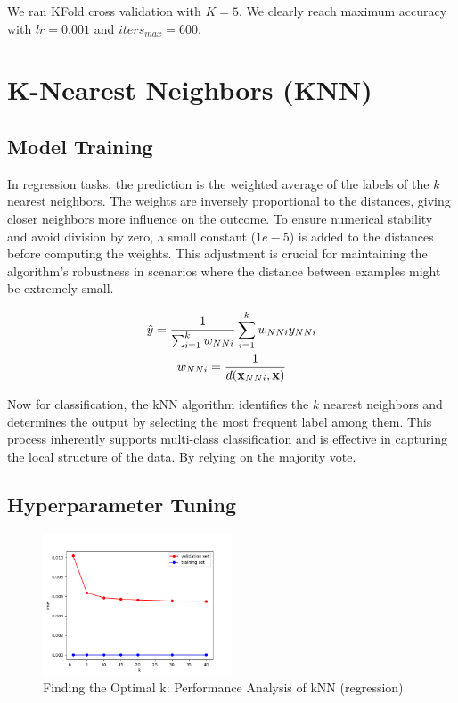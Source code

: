 \documentclass[10pt,twocolumn]{article}
\begin{document}
We ran KFold cross validation with \(K = 5\).
We clearly reach maximum accuracy with \(lr = 0.001\) and \(iters_{max} = 600\).

\section{K-Nearest Neighbors (KNN)}

\subsection{Model Training}
In regression tasks, the prediction is the weighted average of the labels of the \(k\) nearest neighbors. The weights are inversely proportional to the distances, giving closer neighbors more influence on the outcome. To ensure numerical stability and avoid division by zero, a small constant (\(1e-5\)) is added to the distances before computing the weights. This adjustment is crucial for maintaining the algorithm's robustness in scenarios where the distance between examples might be extremely small.

\begin{gather*}
\hat{y} = \frac{1}{\sum_{i=1}^{k} w_{NNi}} \sum_{i=1}^{k} w_{NNi}y_{NNi} \notag \\
w_{NNi} = \frac{1}{d(\mathbf{x}_{NNi}, \mathbf{x})}
\end{gather*}


Now for classification, the kNN algorithm identifies the \(k\) nearest neighbors and determines the output by selecting the most frequent label among them. This process inherently supports multi-class classification and is effective in capturing the local structure of the data. By relying on the majority vote.


\subsection{Hyperparameter Tuning}
\begin{figure}[htbp]
\centering
\includegraphics[width=0.5\textwidth]{KNNRegression.png}
\caption{Finding the Optimal k: Performance Analysis of kNN (regression). }
\label{fig:image3}
\end{figure} \
\end{document}
